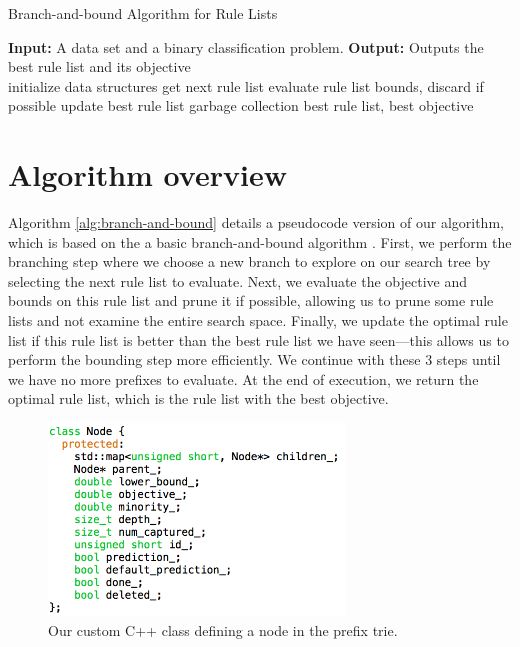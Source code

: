 \begin{algorithm}[t!]
  \caption{Branch-and-bound Algorithm for Rule Lists}
\label{alg:branch-and-bound}
\begin{algorithmic}
\normalsize
\State \textbf{Input:} A data set and a binary classification problem.
\State \textbf{Output:} Outputs the best rule list and its objective\\
\State initialize data structures
	\State get next rule list
	\State evaluate rule list bounds, discard if possible
		\State update best rule list
		\State garbage collection
	\EndIf
\EndWhile
\State \Return best rule list, best objective
\end{algorithmic}
\end{algorithm}

\section{Algorithm overview}
Algorithm \ref{alg:branch-and-bound} details a pseudocode version of our algorithm, which is based on the a basic branch-and-bound algorithm \cite{LandDo60}.
First, we perform the branching step where we choose a new branch to explore on our search tree by selecting the next rule list to evaluate.
Next, we evaluate the objective and bounds on this rule list and prune it if possible, allowing us to prune some rule lists and not examine the entire search space.
Finally, we update the optimal rule list if this rule list is better than the best rule list we have seen---this allows us to perform the bounding step more efficiently.
We continue with these 3 steps until we have no more prefixes to evaluate.
At the end of execution, we return the optimal rule list, which is the rule list with the best objective.

\begin{figure}[t!]
\begin{center}
\includegraphics[width=0.7\textwidth]{figs/cache_node.png}
\end{center}
\caption{Our custom C++ class defining a node in the prefix trie.}
\label{fig:cache_node}
\end{figure}

